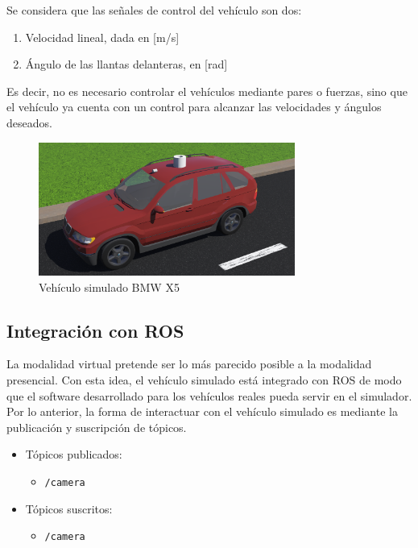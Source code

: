 \documentclass[letterpaper,12pt]{article}
\begin{document}
Se considera que las señales de control del vehículo son dos:
\begin{enumerate}
\item Velocidad lineal, dada en [m/s]
\item Ángulo de las llantas delanteras, en [rad]
\end{enumerate}
Es decir, no es necesario controlar el vehículos mediante pares o fuerzas, sino que el vehículo ya cuenta con un control para alcanzar las velocidades y ángulos deseados.

\begin{figure}
  \centering
  \includegraphics[width=0.75\textwidth]{Figures/Bmw.png}
  \caption{Vehículo simulado BMW X5}
  \label{fig:BmwX5}
\end{figure}

\subsection{Integración con ROS}
La modalidad virtual pretende ser lo más parecido posible a la modalidad presencial. Con esta idea, el vehículo simulado está integrado con ROS de modo que el software desarrollado para los vehículos reales pueda servir en el simulador. Por lo anterior, la forma de interactuar con el vehículo simulado es mediante la publicación y suscripción de tópicos.

\begin{itemize}
\item Tópicos publicados:
  \begin{itemize}
    \item \texttt{/camera}
  \end{itemize}
\item Tópicos suscritos:
  \begin{itemize}
    \item \texttt{/camera}
  \end{itemize}
\end{itemize}


\end{document}
